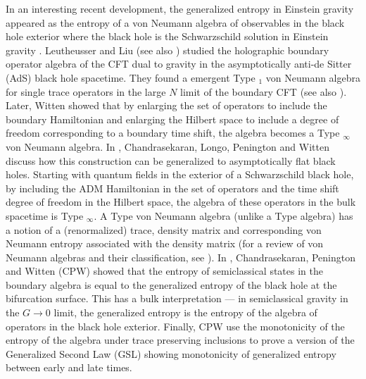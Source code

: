 \documentclass[12pt]{article}
\newcommand{\RomanNumeralCaps}[1]
    {\MakeUppercase{\romannumeral #1}}
\begin{document}
In an interesting recent development, the generalized entropy in Einstein gravity appeared as the entropy of a von Neumann algebra of observables in the black hole exterior where the black hole is the Schwarzschild solution in Einstein gravity \cite{VGE}. Leutheusser and Liu \cite{LL} (see also \cite{LL1} ) studied the holographic boundary operator algebra of the CFT dual to gravity in the asymptotically anti-de Sitter (AdS) black hole spacetime. They found a emergent Type  \RomanNumeralCaps {3}$_1$ von Neumann algebra for single trace operators in the large $N$ limit of the boundary CFT (see also \cite{lashkari}). Later, Witten \cite{EW3} showed that by enlarging the set of operators to include the boundary Hamiltonian and enlarging the Hilbert space to include a degree of freedom corresponding to a boundary time shift, the algebra becomes a Type \RomanNumeralCaps {2}$_\infty$ von Neumann algebra. In \cite{VRGE}, Chandrasekaran, Longo, Penington and Witten discuss how this construction can be generalized to asymptotically flat black holes. Starting with quantum fields in the exterior of a Schwarzschild black hole, by including the ADM Hamiltonian in the set of operators and the time shift degree of freedom in the Hilbert space, the algebra of these operators in the bulk spacetime is Type \RomanNumeralCaps {2}$_\infty$. A Type \RomanNumeralCaps {2} von Neumann algebra (unlike a Type  \RomanNumeralCaps {3} algebra) has a notion of a (renormalized) trace, density matrix and corresponding von Neumann entropy associated with the density matrix (for a review of von Neumann algebras and their classification, see \cite{EW1}). In \cite{VGE}, Chandrasekaran, Penington and Witten (CPW) showed that the entropy of semiclassical states in the boundary algebra is equal to the generalized entropy of the black hole at the bifurcation surface. This has a bulk interpretation --- in semiclassical gravity in the $G \to 0$ limit, the generalized entropy is the entropy of the algebra of operators in the black hole exterior. Finally, CPW use the monotonicity of the entropy of the algebra under trace preserving inclusions to prove a version of the Generalized Second Law (GSL) showing monotonicity of generalized entropy between early and late times.
\end{document}
